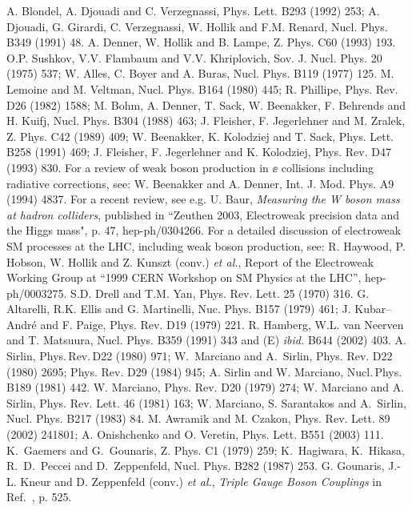 \begin{thebibliography}{999}
A. Blondel, A. Djouadi and C. Verzegnassi,  Phys. Lett. B293 (1992) 253;
A. Djouadi, G. Girardi, C. Verzegnassi, W. Hollik and F.M. Renard,
Nucl. Phys. B349 (1991) 48. 
%
 A. Denner, W. Hollik and B. Lampe, Z. Phys. C60 (1993)
193.  
%
 O.P. Sushkov, V.V. Flambaum and V.V. Khriplovich, 
Sov. J. Nucl. Phys. 20 (1975) 537; W. Alles, C. Boyer and A. Buras,  
Nucl. Phys. B119 (1977) 125.   
%
  M. Lemoine and M. Veltman, Nucl. Phys. B164 (1980) 445; 
R. Phillipe, Phys. Rev. D26 (1982) 1588; M. Bohm, A. Denner, T. Sack, W. 
Beenakker, F. Behrends and H. Kuifj, Nucl. Phys. B304 (1988) 463; 
J. Fleisher, F. Jegerlehner and M. Zralek, Z. Phys. C42 (1989) 409; 
W.  Beenakker, K. Kolodziej and T. Sack, Phys. Lett. B258 (1991) 469; 
J. Fleisher, F. Jegerlehner and K. Kolodziej, Phys. Rev. D47 (1993) 830.  
%
 For a review of weak boson production in $\ee$ collisions
including radiative corrections, see: W. Beenakker and A. Denner, Int. J. 
Mod. Phys. A9 (1994) 4837. 
%
 For a recent review, see e.g. U. Baur, 
{\it Measuring the W boson mass at hadron colliders}, published in 
``Zeuthen 2003, Electroweak precision data and the Higgs mass", p. 47, 
hep-ph/0304266. 
%
 For a detailed discussion of electroweak SM processes at the 
LHC, including weak boson production, see: R. Haywood, P. Hobson, W. Hollik 
and Z. Kunszt (conv.) {\it et al.}, Report of the Electroweak Working Group at 
``1999 CERN Workshop on SM Physics at the LHC'', hep-ph/0003275.
%
 S.D. Drell and T.M. Yan, Phys. Rev. Lett. 25 (1970) 316. 
%
 G. Altarelli, R.K. Ellis and G. Martinelli, Nuc. Phys. B157 
(1979) 461; J. Kubar--Andr\'e and F. Paige, Phys. Rev. D19 (1979) 221. 
%
 R. Hamberg, W.L. van Neerven and T. Matsuura, Nucl. Phys.  B359
(1991) 343 and (E) {\it ibid.} B644 (2002) 403. 
%
%
 A.\, Sirlin, Phys.\,Rev.\,D22 (1980) 971;
W.\ Marciano and A.\ Sirlin, Phys. Rev. D22 (1980) 2695; \ib Phys. Rev. D29 
(1984) 945; A. Sirlin and W. Marciano, Nucl.\,Phys.\,B189 (1981) 442. 
 W. Marciano, Phys. Rev. D20 (1979) 274; W. Marciano
and A. Sirlin,  Phys. Rev. Lett. 46 (1981) 163; W. Marciano, S. Sarantakos and 
A.~Sirlin, Nucl. Phys. B217 (1983) 84. 
%
 M. Awramik and M. Czakon, Phys. Rev. Lett. 89 (2002) 241801;
A. Onishchenko and O. Veretin, Phys. Lett. B551 (2003) 111. 
% 
 K.~Gaemers and G.~Gounaris, Z. Phys. C1 (1979) 259; 
K.~Hagiwara, K.~Hikasa, R.~D.~Peccei and D.~Zeppenfeld, Nucl. Phys. B282
(1987) 253.
%
 G. Gounaris, J.-L. Kneur and D. Zeppenfeld (conv.) {\it et 
al.}, {\it Triple Gauge Boson Couplings} in Ref.~\cite{W-Physics}, p. 525. 
%


\end{thebibliography}
